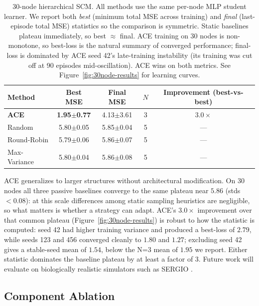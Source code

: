 \documentclass{article}
\theoremstyle{plain}
\theoremstyle{definition}
\theoremstyle{remark}
\begin{document}
\begin{table}[t]
\centering
\caption{30-node hierarchical SCM. All methods use the same per-node MLP student learner. We report both \emph{best} (minimum total MSE across training) and \emph{final} (last-episode total MSE) statistics so the comparison is symmetric. Static baselines plateau immediately, so best $\approx$ final. ACE training on 30 nodes is non-monotone, so best-loss is the natural summary of converged performance; final-loss is dominated by ACE seed 42's late-training instability (its training was cut off at 90 episodes mid-oscillation). ACE wins on both metrics. See Figure~\ref{fig:30node-results} for learning curves.}
\label{tab:large-scale}
\small
\begin{tabular}{@{}lcccc@{}}
\toprule
Method & Best MSE & Final MSE & $N$ & Improvement (best-vs-best) \\
\midrule
\textbf{ACE} & \textbf{1.95$\pm$0.77} & 4.13$\pm$3.61 & 3 & $3.0\times$ \\
\midrule
Random       & 5.80$\pm$0.05 & 5.85$\pm$0.04 & 5 & --- \\
Round-Robin  & 5.79$\pm$0.06 & 5.86$\pm$0.07 & 5 & --- \\
Max-Variance & 5.80$\pm$0.04 & 5.86$\pm$0.08 & 5 & --- \\
\bottomrule
\end{tabular}
\end{table}

ACE generalizes to larger structures without architectural modification. On 30 nodes all three passive baselines converge to the same plateau near $5.86$ (stds $<0.08$): at this scale differences among static sampling heuristics are negligible, so what matters is whether a strategy can adapt. ACE's $3.0\times$ improvement over that common plateau (Figure~\ref{fig:30node-results}) is robust to how the statistic is computed: seed 42 had higher training variance and produced a best-loss of $2.79$, while seeds 123 and 456 converged cleanly to $1.80$ and $1.27$; excluding seed 42 gives a stable-seed mean of $1.54$, below the N=3 mean of $1.95$ we report. Either statistic dominates the baseline plateau by at least a factor of 3. Future work will evaluate on biologically realistic simulators such as SERGIO \citep{dibaeinia2020sergio}.

\subsection{Component Ablation}
\label{sec:results-ablation}
\end{document}
